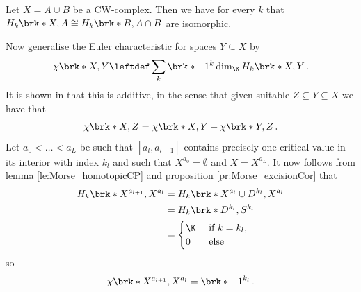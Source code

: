 \begin{proposition}
  \label{pr:Morse_excisionCor}
  Let $X=A\cup B$ be a CW-complex. Then we have for every $k$ that $H_k\brk*{X,A}\cong H_k\brk*{B,A\cap B}$
  are isomorphic.
\end{proposition}
Now generalise the Euler characteristic for spaces $Y\subseteq X$ by
\begin{align}
  \chi\brk*{X,Y}\leftdef \sum_k\brk*{-1}^k\dim_\K H_k\brk*{X,Y}\,.
  \label{eq:Morse_relativeEuler}
\end{align}
It is shown in \cite[§5]{Milnor1963} that this is additive, in the sense that given suitable $Z\subseteq Y\subseteq X$
we have that
\begin{align}
  \chi\brk*{X,Z}=\chi\brk*{X,Y}+\chi\brk*{Y,Z}\label{eq:MorseIneq_additivChi}\,.
\end{align}
Let $a_0<\dots<a_L$ be such that $[a_l,a_{l+1}]$ contains precisely one critical value in its interior with
index $k_l$ and such that $X^{a_0}=\emptyset$ and  $X=X^{a_L}$.
It now follows from lemma \ref{le:Morse_homotopicCP} and proposition \ref{pr:Morse_excisionCor} that
\begin{align*}
  H_k\brk*{X^{a_{l+1}},X^{a_{l}}}
  &=H_k\brk*{X^{a_{l}}\cup D^{k_l},X^{a_{l}}} \\
  &= H_k\brk*{D^{k_l},S^{k_l}} \\
  &=\begin{cases}
    \K &\text{ if }k=k_l,\\
    0 &\text{ else}
  \end{cases}
\end{align*}
so
\begin{align}
  \chi\brk*{X^{a_{l+1}},X^{a_l}}=\brk*{-1}^{k_l}\,.\label{eq:Morse_chiSingleCP}
\end{align}

